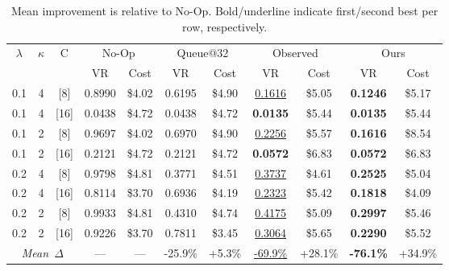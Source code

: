 \documentclass{article}
\begin{document}
\begin{table}[t]
\centering
\footnotesize
\setlength{\tabcolsep}{2.5pt}
\caption{Mean improvement is relative to No-Op. Bold/underline indicate first/second best per row, respectively.}\label{tab:todo}
\begin{tabular}{c c c || c c | c c | c c | c c}
\toprule
$\lambda$ & $\kappa$ & C & \multicolumn{2}{c|}{No-Op} & \multicolumn{2}{c|}{Queue@32} & \multicolumn{2}{c|}{Observed} & \multicolumn{2}{c}{Ours} \\
 &  &  & VR & Cost & VR & Cost & VR & Cost & VR & Cost \\
\hline
0.1 & 4 & [8] & 0.8990 & \$4.02 & 0.6195 & \$4.90 & \underline{0.1616} & \$5.05 & \textbf{0.1246} & \$5.17 \\
0.1 & 4 & [16] & 0.0438 & \$4.72 & 0.0438 & \$4.72 & \textbf{0.0135} & \$5.44 & \textbf{0.0135} & \$5.44 \\
0.1 & 2 & [8] & 0.9697 & \$4.02 & 0.6970 & \$4.90 & \underline{0.2256} & \$5.57 & \textbf{0.1616} & \$8.54 \\
0.1 & 2 & [16] & 0.2121 & \$4.72 & 0.2121 & \$4.72 & \textbf{0.0572} & \$6.83 & \textbf{0.0572} & \$6.83 \\
0.2 & 4 & [8] & 0.9798 & \$4.81 & 0.3771 & \$4.51 & \underline{0.3737} & \$4.61 & \textbf{0.2525} & \$5.04 \\
0.2 & 4 & [16] & 0.8114 & \$3.70 & 0.6936 & \$4.19 & \underline{0.2323} & \$5.42 & \textbf{0.1818} & \$4.09 \\
0.2 & 2 & [8] & 0.9933 & \$4.81 & 0.4310 & \$4.74 & \underline{0.4175} & \$5.09 & \textbf{0.2997} & \$5.46 \\
0.2 & 2 & [16] & 0.9226 & \$3.70 & 0.7811 & \$3.45 & \underline{0.3064} & \$5.65 & \textbf{0.2290} & \$5.52 \\
\hline
\multicolumn{3}{c||}{\textit{Mean~$\Delta$}} & --- & --- & -25.9\% & +5.3\% & \underline{-69.9\%} & +28.1\% & \textbf{-76.1\%} & +34.9\% \\
\bottomrule
\end{tabular}
\end{table}
\end{document}
